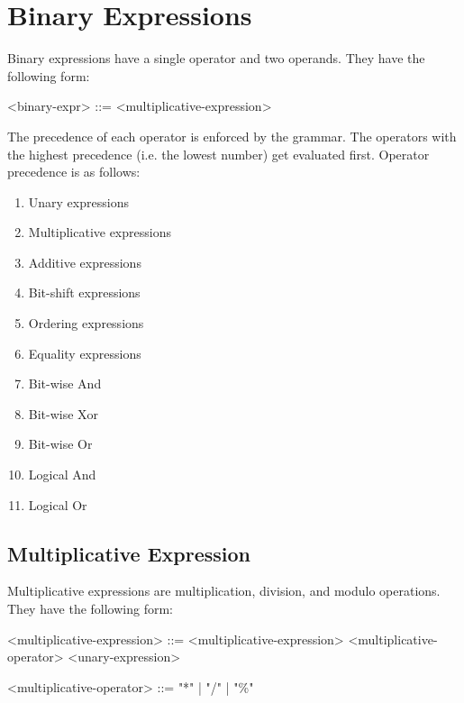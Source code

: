 \section{Binary Expressions} \label{guide:binary_expr}

Binary expressions have a single operator and two operands. They have the following form:

\begin{minip}
\begin{grammar}
<binary-expr> ::= <multiplicative-expression>
\end{grammar}
\end{minip}

The precedence of each operator is enforced by the grammar. The operators with the highest precedence (i.e. the lowest number) get evaluated first. Operator precedence is as follows:

\begin{enumerate}
\singlespacing
\item Unary expressions
\item Multiplicative expressions
\item Additive expressions
\item Bit-shift expressions
\item Ordering expressions
\item Equality expressions
\item Bit-wise And
\item Bit-wise Xor
\item Bit-wise Or
\item Logical And
\item Logical Or
\end{enumerate}

\subsection{Multiplicative Expression} \label{guide:mult_expr}

Multiplicative expressions are multiplication, division, and modulo operations. They have the following form:

\begin{minip}
\begin{grammar}
<multiplicative-expression> ::= <multiplicative-expression> 
<multiplicative-operator> <unary-expression>

<multiplicative-operator> ::= "*" | "/" | "\%"
\end{grammar}
\end{minip}

